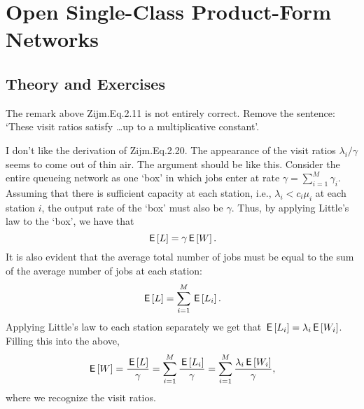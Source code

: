 \section{Open Single-Class Product-Form Networks}
\label{sec:jackson-networks}


\subsection*{Theory and Exercises}


The remark above Zijm.Eq.2.11 is not entirely correct. Remove the
sentence: `These visit ratios satisfy \ldots up to a multiplicative
constant'.


I don't like the derivation of Zijm.Eq.2.20. The appearance of the
visit ratios $\lambda_i/\gamma$ seems to come out of thin air. The
argument should be like this. Consider the entire queueing network as
one `box' in which jobs enter at rate $\gamma=\sum_{i=1}^M
\gamma_i$.
Assuming that there is sufficient capacity at each station, i.e.,
$\lambda_i < c_i \mu_i$ at each station $i$, the output rate of the `box' must also be $\gamma$. Thus, by applying Little's law to the `box', we have that 
\begin{equation*}
  \,\mathsf{E}\left[L\right] = \gamma \,\mathsf{E}\left[W\right]. 
\end{equation*}
It is also evident that the average total number of jobs must be equal
to the sum of the average number of  jobs at each station: 
\begin{equation*}
  \,\mathsf{E}\left[L\right] = \sum_{i=1}^M \,\mathsf{E}\left[L_i\right].
\end{equation*}
Applying Little's law to each station separately we get that
$\,\mathsf{E}\left[L_i\right] = \lambda_i\,\mathsf{E}\left[W_i\right]$. Filling this into the above,
\begin{equation*}
\,\mathsf{E}\left[W\right] = \frac{\,\mathsf{E}\left[L\right]}{\gamma}  = \sum_{i=1}^M \frac{\,\mathsf{E}\left[L_i\right]}\gamma = \sum_{i=1}^M \frac{\lambda_i \,\mathsf{E}\left[ W_i\right]}\gamma, 
\end{equation*}
where we recognize the visit ratios.


